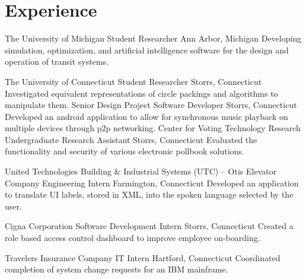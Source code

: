 \section{Experience}
		{The University of Michigan}
		{Student Researcher}
		{Ann Arbor, Michigan}{}
		{Developing simulation, optimization, and artificial intelligence software for the design and operation of transit systems.}
		
		{The University of Connecticut}
		{Student Researcher}
		{Storrs, Connecticut}{}
		{Investigated equivalent representations of circle packings and algorithms to manipulate them.}
		{Senior Design Project}
		{Software Developer}
		{Storrs, Connecticut}{}
		{Developed an android application to allow for synchronous music playback on multiple devices through p2p networking.}
		{Center for Voting Technology Research}
		{Undergraduate Research Assistant}
		{Storrs, Connecticut}{}
		{Evaluated the functionality and security of various electronic pollbook solutions.}

		{United Technologies Building \& Industrial Systems (UTC) -- Otis Elevator Company}
		{Engineering Intern}
		{Farmington, Connecticut}{}
		{Developed an application to translate UI labels, stored in XML, into the spoken language selected by the user.}

		{Cigna Corporation}
		{Software Development Intern}
		{Storrs, Connecticut}{}
		{Created a role based access control dashboard to improve employee on-boarding.}

		{Travelers Insurance Company}
		{IT Intern}
		{Hartford, Connecticut}{}
		{Coordinated completion of system change requests for an IBM mainframe.}
